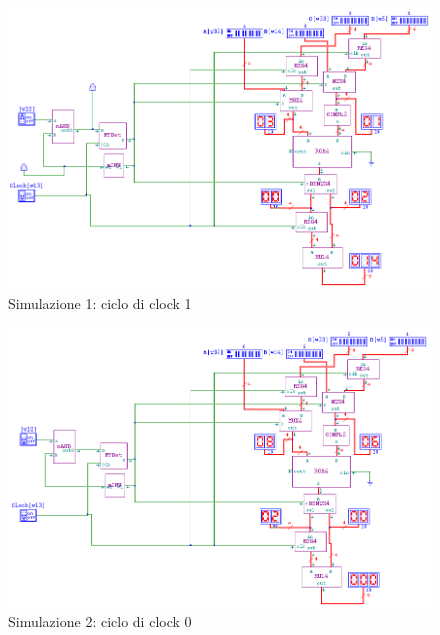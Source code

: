 \documentclass[10pt]{article}
\begin{document}
\begin{itemize}
\begin{figure}[H]
    \begin{minipage}[c]{\textwidth}
    \centering
    \includegraphics[width=\textwidth]{s1c1}
    \caption{Simulazione 1: ciclo di clock 1}
    \label{ }
    \end{minipage}
\end{figure}

\begin{figure}[H]
    \begin{minipage}[c]{\textwidth}
    \centering
    \includegraphics[width=\textwidth]{s2c0}
    \caption{Simulazione 2: ciclo di clock 0}
    \label{ }
    \end{minipage}
\end{figure}


\end{itemize}
\end{document}
